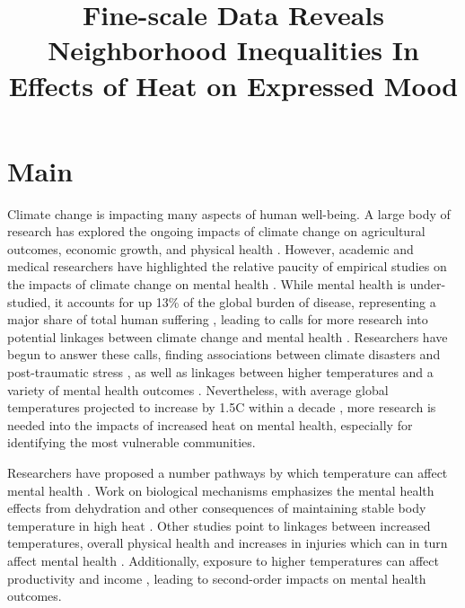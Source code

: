 \documentclass[fleqn,10pt]{wlscirep}
\title{Fine-scale Data Reveals Neighborhood Inequalities In Effects of Heat on Expressed Mood}
\author{}
\begin{document}
\raggedbottom
\maketitle
\thispagestyle{empty}

\section*{Main}
Climate change is impacting many aspects of human well-being. A large body of research has explored the ongoing impacts of climate change on agricultural outcomes, economic growth, and physical health \cite{pachauri2014climate}. However, academic and medical researchers have highlighted the relative paucity of empirical studies on the impacts of climate change on mental health \cite{Berry2018Apr}. While mental health is under-studied, it accounts for up 13\% of the global burden of disease, representing a major share of total human suffering \cite{Collins2011Jul}, leading to calls for more research into potential linkages between climate change and mental health \cite{Berry2018Apr, Collins2011Jul}. Researchers have begun to answer these calls, finding associations between climate disasters and post-traumatic stress \cite{Schwartz2017Aug}, as well as linkages between higher temperatures and a variety of mental health outcomes \cite{baylis_weather_2018, Mullins2019Dec, Obradovich2018Oct}. Nevertheless, with average global temperatures projected to increase by 1.5\textdegree C within a decade \cite{allen2019technical}, more research is needed into the impacts of increased heat on mental health, especially for identifying the most vulnerable communities.

Researchers have proposed a number pathways by which temperature can affect mental health \cite{Berry2018Apr, Palinkas2020Apr}. Work on biological mechanisms emphasizes the mental health effects from dehydration and other consequences of maintaining stable body temperature in high heat \cite{Lohmus2018Jul}. Other studies point to linkages between increased temperatures, overall physical health and increases in injuries which can in turn affect mental health \cite{Berry2007}. Additionally, exposure to higher temperatures can affect productivity and income \cite{Burke2015Nov}, leading to second-order impacts on mental health outcomes.
\end{document}
